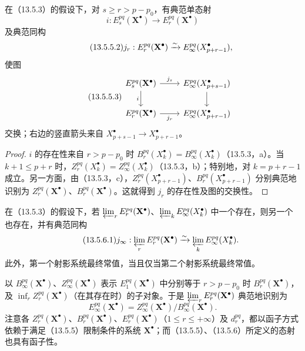 在（13.5.3）的假设下，对 $s\geq r>p-p_0$，有典范单态射
\begin{equation}\tag{13.5.5.1}
i:E_s^{pq}(\mathbf X^\bullet)\to E_r^{pq}(\mathbf X^\bullet)
\end{equation}
及典范同构
\begin{equation}\tag{13.5.5.2}
j_r:E_r^{pq}(\mathbf X^\bullet)\xrightarrow{\sim} E_\infty^{pq}(X_{p+r-1}^\bullet),
\end{equation}
使图
\begin{equation}\tag{13.5.5.3}
\begin{tikzcd}
E_s^{pq}(\mathbf X^\bullet)\arrow[r,"j_s"]\arrow[d,"i"']&E_\infty^{pq}(X_{p+s-1}^\bullet)\arrow[d]\\
E_r^{pq}(\mathbf X^\bullet)\arrow[r,"j_r"']&E_\infty^{pq}(X_{p+r-1}^\bullet)
\end{tikzcd}
\end{equation}
交换；右边的竖直箭头来自 $X_{p+s-1}^\bullet\to X_{p+r-1}^\bullet$。
\begin{proof}
$i$ 的存在性来自 $r>p-p_0$ 时 $B_r^{pq}(X_k^\bullet)=B_\infty^{pq}(X_k^\bullet)$（13.5.3，a）。当 $k+1\leq p+r$ 时，$Z_r^{pq}(X_k^\bullet)=Z_\infty^{pq}(X_k^\bullet)$（13.5.3，b）；特别地，对 $k=p+r-1$ 成立。另一方面，由（13.5.3，c），$Z_r^{pq}(X_{p+r-1}^\bullet)$、$B_r^{pq}(X_{p+r-1}^\bullet)$ 分别典范地识别为 $Z_r^{pq}(\mathbf X^\bullet)$、$B_r^{pq}(\mathbf X^\bullet)$。这就得到 $j_r$ 的存在性及图的交换性。
\end{proof}

在（13.5.3）的假设下，若 $\varprojlim_rE_r^{pq}(\mathbf X^\bullet)$、$\varprojlim_kE_\infty^{pq}(X_k^\bullet)$ 中一个存在，则另一个也存在，并有典范同构
\begin{equation}\tag{13.5.6.1}
j_\infty:\varprojlim_rE_r^{pq}(\mathbf X^\bullet)\xrightarrow{\sim}\varprojlim_kE_\infty^{pq}(X_k^\bullet).
\end{equation}
此外，第一个射影系统最终常值，当且仅当第二个射影系统最终常值。

以 $B_\infty^{pq}(\mathbf X^\bullet)$、$Z_\infty^{pq}(\mathbf X^\bullet)$ 表示 $E_1^{pq}(\mathbf X^\bullet)$ 中分别等于 $r>p-p_0$ 时 $B_r^{pq}(\mathbf X^\bullet)$，及 $\inf_r Z_r^{pq}(\mathbf X^\bullet)$（在其存在时）的子对象。于是 $\varprojlim_rE_r^{pq}(\mathbf X^\bullet)$ 典范地识别为
\[
E_\infty^{pq}(\mathbf X^\bullet)
=Z_\infty^{pq}(\mathbf X^\bullet)/B_\infty^{pq}(\mathbf X^\bullet).
\]
注意各 $Z_r^{pq}(\mathbf X^\bullet)$、$B_r^{pq}(\mathbf X^\bullet)$、$E_r^{pq}(\mathbf X^\bullet)$（$1\leq r\leq+\infty$）及 $d_r^{pq}$，都以函子方式依赖于满足（13.5.5）限制条件的系统 $\mathbf X^\bullet$；而（13.5.5）、（13.5.6）所定义的态射也具有函子性。

